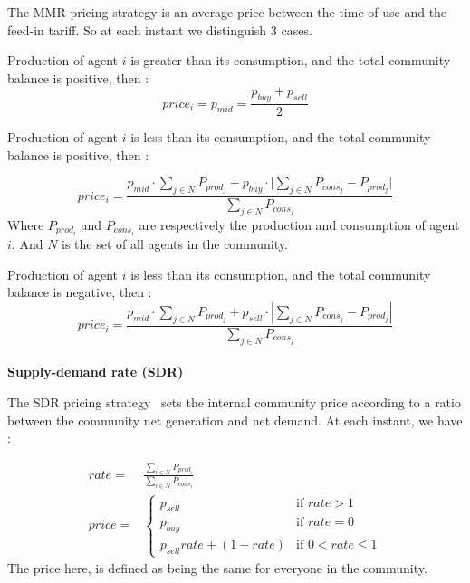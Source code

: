 The MMR pricing strategy \cite{article_1} is an average price between
the time-of-use and the feed-in tariff. So at each instant we distinguish 3 cases. 


Production of agent $i$ is greater than its consumption, and the total community balance is positive, then : 
\begin{equation}
    price_{i} = p_{mid} = \frac{p_{buy}+p_{sell}}{2} 
\end{equation} 

Production of agent $i$ is less than its consumption, and the total community balance is positive, then : 

\begin{equation}
    price_{i} = \frac{p_{mid} \cdot \sum\limits_{j \in N}{P_{prod_j}} + p_{buy} \cdot |\sum\limits_{j \in N}{P_{cons_j} - P_{prod_j}|}}{\sum\limits_{j \in N}{P_{cons_j}}} 
\end{equation}
Where $P_{prod_i}$ and $P_{cons_i}$ are respectively the production and consumption of agent $i$. And $N$ is the set of all agents in the community.

Production of agent $i$ is less than its consumption, and the total community balance is negative, then :
\begin{equation}
    price_{i} = \frac{p_{mid} \cdot \sum\limits_{j \in N}{P_{prod_j}} + p_{sell} \cdot |\sum\limits_{j \in N}{P_{cons_j} - P_{prod_j}}|}{\sum\limits_{j \in N}{P_{cons_j}}} 
\end{equation}
\\

\noindent\textbf{Supply-demand rate (SDR)}

The SDR pricing strategy \cite{article_1} sets the internal community price according to a ratio between the community net generation and net demand. At each instant, we have :

\begin{eqnarray}
    rate =& \frac{\sum\limits_{i \in N}{P_{prod_i}}}{\sum\limits_{i \in N}{P_{cons_i}}}  \\
    price =& \begin{cases}
        p_{sell} & \text{if } rate > 1 \\
        p_{buy} & \text{if } rate=0 \\
        p_{sell} rate + (1- rate) & \text{if } 0 < rate \leq 1    
    \end{cases}  
\end{eqnarray}
The price here, is defined as being the same for everyone in the community.
\\

